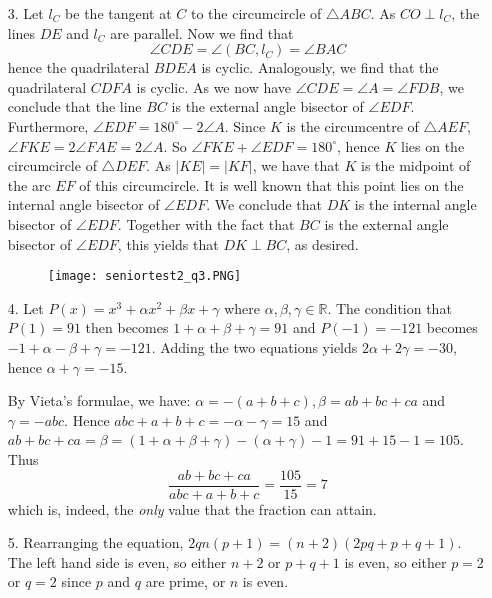 \documentclass[a4paper, 12pt]{article}
\begin{document}
\begin{enumerate}
    
    \item[3.] Let $l_C$ be the tangent at $C$ to the circumcircle of $\triangle ABC$. As $CO \perp l_C$, the lines $DE$ and $l_C$ are parallel. Now we find that
    $$ \angle CDE = \angle (BC, l_C) = \angle BAC $$
    hence the quadrilateral $BDEA$ is cyclic. Analogously, we find that the quadrilateral $CDFA$ is cyclic. As we now have $\angle CDE = \angle A = \angle FDB$, we conclude that the line $BC$ is the external angle bisector of $\angle EDF$. Furthermore, $\angle EDF = 180^\circ - 2 \angle A$. Since $K$ is the circumcentre of $\triangle AEF$, $\angle FKE = 2 \angle FAE = 2 \angle A$. So $\angle FKE + \angle EDF = 180^\circ$, hence $K$ lies on the circumcircle of $\triangle DEF$. As $|KE| = |KF|$, we have that $K$ is the midpoint of the arc $EF$ of this circumcircle. It is well known that this point lies on the internal angle bisector of $\angle EDF$. We conclude that $DK$ is the internal angle bisector of $\angle EDF$. Together with the fact that $BC$ is the external angle bisector of $\angle EDF$, this yields that $DK \perp BC$, as desired.
    
    \begin{figure}[h!]
        \centering
        \texttt{[image: seniortest2\_q3.PNG]}
    \end{figure}
    
    
    \item[4.] Let $P(x) = x^3 + \alpha x^2 + \beta x + \gamma$ where $\alpha, \beta, \gamma \in \mathbb{R}$. The condition that $P(1) = 91$ then becomes $1 + \alpha + \beta + \gamma = 91$ and $P(-1) = -121$ becomes $-1 + \alpha - \beta + \gamma = -121$. Adding the two equations yields $2 \alpha + 2 \gamma = -30$, hence $\alpha + \gamma = -15$.
    
    By Vieta's formulae, we have: $\alpha = -(a+b+c), \beta = ab + bc + ca$ and $\gamma = -abc$. Hence $abc + a + b + c = - \alpha - \gamma = 15$ and $ab+bc+ca = \beta = (1 + \alpha + \beta + \gamma) - (\alpha + \gamma) - 1 = 91 + 15 - 1 = 105$. Thus
    \[  \frac{ab+bc+ca}{abc+a+b+c} = \frac{105}{15} = 7  \]
    which is, indeed, the \textit{only} value that the fraction can attain.
    
    
    \item[5.] Rearranging the equation, $2qn(p + 1) = (n + 2)(2pq + p + q + 1)$. The left hand side is even, so either $n + 2$ or $p + q + 1$ is even, so either $p = $2 or $q = 2$ since $p$ and $q$ are prime, or $n$ is even.
    

\end{enumerate}
\end{document}

